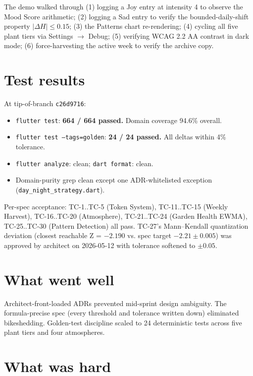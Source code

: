 \documentclass[11pt,a4paper]{article}
\begin{document}
The demo walked through (1) logging a Joy entry at intensity 4 to observe
the Mood Score arithmetic; (2) logging a Sad entry to verify the
bounded-daily-shift property $|\Delta H| \leq 0.15$; (3) the Patterns chart
re-rendering; (4) cycling all five plant tiers via Settings $\to$ Debug; (5)
verifying WCAG 2.2 AA contrast in dark mode; (6) force-harvesting the
active week to verify the archive copy.

\section{Test results}

At tip-of-branch \texttt{c26d9716}:

\begin{itemize}[leftmargin=*]
\item \texttt{flutter test}: \textbf{664 / 664 passed.} Domain coverage 94.6\% overall.
\item \texttt{flutter test --tags=golden}: \textbf{24 / 24 passed.} All deltas within 4\% tolerance.
\item \texttt{flutter analyze}: clean; \texttt{dart format}: clean.
\item Domain-purity grep clean except one ADR-whitelisted exception (\texttt{day\_night\_strategy.dart}).
\end{itemize}

Per-spec acceptance: TC-1..TC-5 (Token System), TC-11..TC-15 (Weekly
Harvest), TC-16..TC-20 (Atmosphere), TC-21..TC-24 (Garden Health EWMA),
TC-25..TC-30 (Pattern Detection) all pass. TC-27's Mann--Kendall
quantization deviation (closest reachable Z = $-2.190$ vs. spec target
$-2.21 \pm 0.005$) was approved by architect on 2026-05-12 with tolerance
softened to $\pm 0.05$.

\section{What went well}

Architect-front-loaded ADRs prevented mid-sprint design ambiguity. The
formula-precise spec (every threshold and tolerance written down)
eliminated bikeshedding. Golden-test discipline scaled to 24 deterministic
tests across five plant tiers and four atmospheres.

\section{What was hard}
\end{document}

